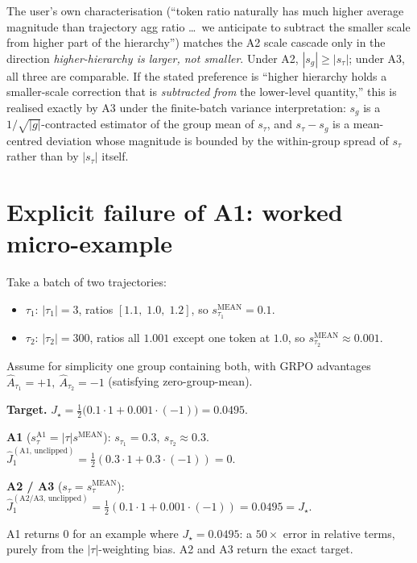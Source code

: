 \documentclass[11pt]{article}
\newcommand{\smean}{s^{\text{MEAN}}}
\begin{document}
The user's own characterisation (``token ratio naturally has much higher
average magnitude than trajectory agg ratio \ldots\ we anticipate to
subtract the smaller scale from higher part of the hierarchy'') matches
the A2 scale cascade only in the direction \emph{higher-hierarchy is
larger, not smaller}. Under A2, $|s_g|\geq|s_\tau|$; under A3, all three
are comparable. If the stated preference is ``higher hierarchy holds a
smaller-scale correction that is \emph{subtracted from} the lower-level
quantity,'' this is realised exactly by A3 under the finite-batch
variance interpretation: $s_g$ is a $1/\sqrt{|g|}$-contracted estimator
of the group mean of $s_\tau$, and $s_\tau - s_g$ is a mean-centred
deviation whose magnitude is bounded by the within-group spread of
$s_\tau$ rather than by $|s_\tau|$ itself.

\section{Explicit failure of A1: worked micro-example}

Take a batch of two trajectories:
\begin{itemize}
\item $\tau_1$: $|\tau_1|=3$, ratios $[1.1,\;1.0,\;1.2]$, so $\smean_{\tau_1}=0.1$.
\item $\tau_2$: $|\tau_2|=300$, ratios all $1.001$ except one token at
      $1.0$, so $\smean_{\tau_2}\approx 0.001$.
\end{itemize}
Assume for simplicity one group containing both, with GRPO advantages
$\hat A_{\tau_1}=+1,\ \hat A_{\tau_2}=-1$ (satisfying zero-group-mean).

\noindent\textbf{Target.}
$J_\star = \tfrac{1}{2}\bigl(0.1\cdot 1 + 0.001\cdot(-1)\bigr) = 0.0495$.

\noindent\textbf{A1} ($s_\tau^{\text{A1}}=|\tau|\smean$): \;
$s_{\tau_1}=0.3,\ s_{\tau_2}\approx 0.3$. \\
$\hat J_1^{(\text{A1, unclipped})}
= \tfrac{1}{2}(0.3\cdot 1 + 0.3\cdot(-1)) = 0$.

\noindent\textbf{A2 / A3} ($s_\tau=\smean_\tau$): \;
$\hat J_1^{(\text{A2/A3, unclipped})}
= \tfrac{1}{2}(0.1\cdot 1 + 0.001\cdot(-1)) = 0.0495 = J_\star$.

A1 returns $0$ for an example where $J_\star=0.0495$: a $50\times$ error
in relative terms, purely from the $|\tau|$-weighting bias. A2 and A3
return the exact target.
\end{document}
